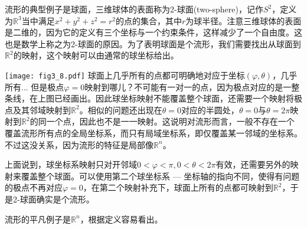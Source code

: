 流形的典型例子是球面，三维球体的表面称为2-球面(two-sphere)，记作$S^2$，定义为$\mathbb{R}^3$当中满足$x^2 + y^2 + z^2 = r^2$的点的集合，其中$r$为球半径。注意三维球体的表面是二维的，因为它的定义有三个坐标与一个约束条件，这样减少了一个自由度。这也是数学上称之为2-球面的原因。为了表明球面是个流形，我们需要找出从球面到$\mathbb{R}^2$的映射，这个映射可以由通常的球坐标给出。

{
\centering
    \texttt{[image: fig3\_8.pdf]}
}
球面上几乎所有的点都可明确地对应于坐标$(\varphi, \theta)$，几乎所有... 但是极点$\varphi = 0$映射到哪儿？不可能有一对一的点，因为极点对应的是一整条线，在上图已经画出。因此球坐标映射不能覆盖整个球面，还需要一个映射将极点及其邻域映射到$\mathbb{R}^2$。相似的问题还出现在$\theta = 0$对应的半圆处，$\theta = 0$与$\theta = 2\pi$映射到$\mathbb{R}^2$的同一个点，因此也不是一一映射。这说明对流形而言，一般不存在一个覆盖流形所有点的全局坐标系，而只有局域坐标系，即仅覆盖某一邻域的坐标系。不过这没关系，因为流形的特征是局部像$\mathbb{R}^n$。

上面说到，球坐标系映射只对开邻域$0 < \varphi < \pi, 0 < \theta < 2\pi$有效，还需要另外的映射来覆盖整个球面。可以使用第二个球坐标系 --- 坐标轴的指向不同，使得有问题的极点不再对应$\varphi = 0$，在第二个映射补充下，球面上所有的点都可映射到$\mathbb{R}^2$，于是2-球面确实是个流形。

流形的平凡例子是$\mathbb{R}^n$，根据定义容易看出。

